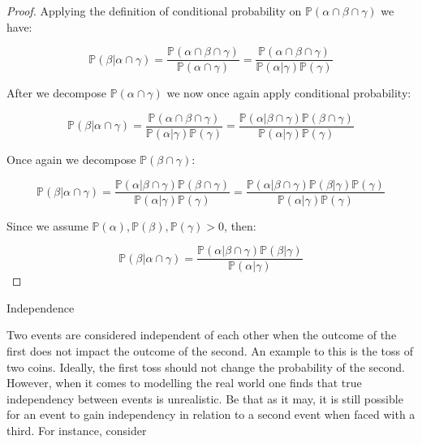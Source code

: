 \documentclass{amsart}
\makeatletter
\def\subsection{\@startsection{subsection}{3}%
  \z@{.5\linespacing\@plus.7\linespacing}{.1\linespacing}%
  {\normalfont\itshape}}
\theoremstyle{plain}
\newcommand{\pr}{\mathbb{P}}
\makeatother
\begin{document}
\begin{proof}
  Applying the definition of conditional probability on $\pr(\alpha\cap\beta\cap\gamma)$ we have:

  \begin{equation*}
    \pr(\beta|\alpha\cap\gamma)=\frac{\pr(\alpha\cap\beta\cap\gamma)}{\pr(\alpha\cap\gamma)}=
    \frac{\pr(\alpha\cap\beta\cap\gamma)}{\pr(\alpha|\gamma)\pr(\gamma)}
  \end{equation*}

  After we decompose $\pr(\alpha\cap\gamma)$ we now once again apply conditional probability:

  \begin{equation*}
    \pr(\beta|\alpha\cap\gamma)=\frac{\pr(\alpha\cap\beta\cap\gamma)}{\pr(\alpha|\gamma)
    \pr(\gamma)}=\frac{\pr(\alpha|\beta\cap\gamma)\pr(\beta\cap\gamma)}{\pr(\alpha|\gamma)
    \pr(\gamma)}
  \end{equation*}

  Once again we decompose $\pr(\beta\cap\gamma)$:

  \begin{equation*}
    \pr(\beta|\alpha\cap\gamma)=\frac{\pr(\alpha|\beta\cap\gamma)\pr(\beta\cap\gamma)}{\pr(\alpha|
    \gamma)\pr(\gamma)}=\frac{\pr(\alpha|\beta\cap\gamma)\pr(\beta|\gamma)\pr(\gamma)}{\pr(\alpha|
    \gamma)\pr(\gamma)}
  \end{equation*}

  Since we assume $\pr(\alpha),\pr(\beta),\pr(\gamma)>0$, then:

  \begin{equation*}
    \pr(\beta|\alpha\cap\gamma)=\frac{\pr(\alpha|\beta\cap\gamma)\pr(\beta|\gamma)}{\pr(\alpha|
    \gamma)}
  \end{equation*}
\end{proof}

\subsection{Independence}

Two events are considered independent of each other when the outcome of the first does not impact
the outcome of the second. An example to this is the toss of two coins. Ideally, the first toss
should not change the probability of the second. However, when it comes to modelling the real world
one finds that true independency between events is unrealistic. Be that as it may, it is still
possible for an event to gain independency in relation to a second event when faced with a third.
For instance, consider

\newpage

\printbibliography[]
\end{document}
